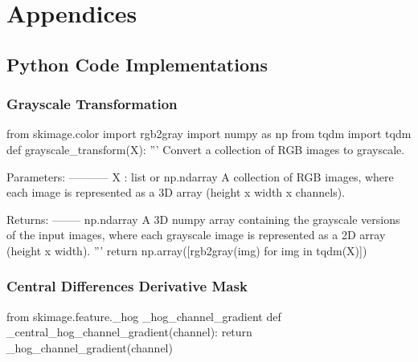 \appendix
\section{Appendices}
\subsection{Python Code Implementations}
\subsubsection{Grayscale Transformation}\label{appendix:grayscale}
\begin{pythoncode}
from skimage.color import rgb2gray
import numpy as np
from tqdm import tqdm
def grayscale_transform(X):
    '''
    Convert a collection of RGB images to grayscale.

    Parameters:
    -----------
    X : list or np.ndarray
        A collection of RGB images, where each image is represented as a 3D array (height x width x channels).

    Returns:
    --------
    np.ndarray
        A 3D numpy array containing the grayscale versions of the input images, 
        where each grayscale image is represented as a 2D array (height x width).
    '''
    return np.array([rgb2gray(img) for img in tqdm(X)])
\end{pythoncode}
\subsubsection{Central Differences Derivative Mask}
\begin{pythoncode}
from skimage.feature._hog _hog_channel_gradient
def _central_hog_channel_gradient(channel):
    return _hog_channel_gradient(channel)
\end{pythoncode}

